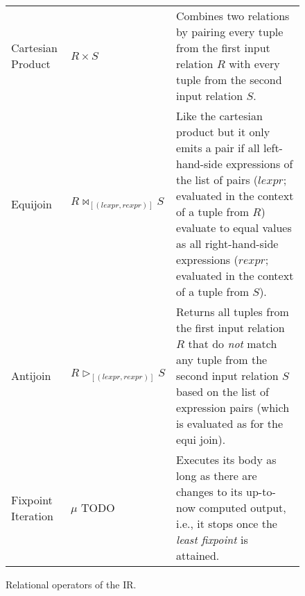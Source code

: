 \begin{figure}[htpb]
\begin{tabular}{@{}p{}p{}p{}@{}}
		Cartesian Product  & \(R \times S\)                                              & Combines two relations by pairing every tuple from the first input relation \(R\) with every tuple from the second input relation \(S\).                                                                                                                                                                          \\
		Equijoin           & \(R \bowtie_{[(\mathit{lexpr}, \mathit{rexpr})]} S\)        & Like the cartesian product but it only emits a pair if all left-hand-side expressions of the list of pairs (\(\mathit{lexpr}\); evaluated in the context of a tuple from \(R\)) evaluate to equal values as all right-hand-side expressions (\(\mathit{rexpr}\); evaluated in the context of a tuple from \(S\)). \\
		Antijoin           & \(R \triangleright_{[(\mathit{lexpr}, \mathit{rexpr})]} S\) & Returns all tuples from the first input relation \(R\) that do \emph{not} match any tuple from the second input relation \(S\) based on the list of expression pairs (which is evaluated as for the equi join).                                                                                                   \\
		Fixpoint Iteration & \(\mu\) TODO                                                & Executes its body as long as there are changes to its up-to-now computed output, i.e., it stops once the \emph{least fixpoint} is attained.                                                                                                                                                                       \\
		\bottomrule
	\end{tabular}
	\caption{Relational operators of the \ac{IR}.}\label{tab:ir-operators}
\end{figure}

